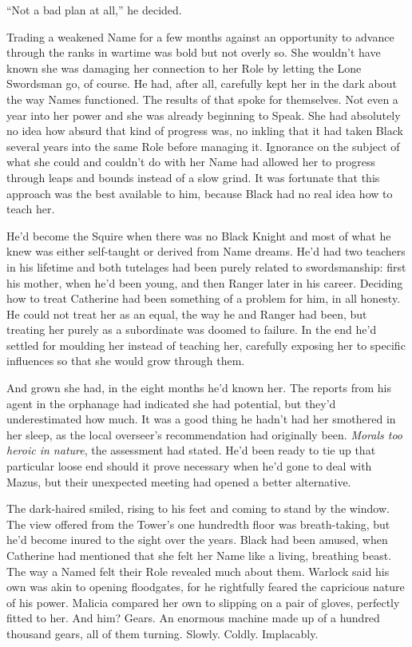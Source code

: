 \documentclass[12pt, openany]{book}
\begin{document}
“Not a bad plan at all,” he decided.

Trading a weakened Name for a few months against an opportunity to advance through the ranks in wartime was bold but not overly so. She wouldn’t have known she was damaging her connection to her Role by letting the Lone Swordsman go, of course. He had, after all, carefully kept her in the dark about the way Names functioned. The results of that spoke for themselves. Not even a year into her power and she was already beginning to Speak. She had absolutely no idea how absurd that kind of progress was, no inkling that it had taken Black several years into the same Role before managing it. Ignorance on the subject of what she could and couldn’t do with her Name had allowed her to progress through leaps and bounds instead of a slow grind. It was fortunate that this approach was the best available to him, because Black had no real idea how to teach her.

He’d become the Squire when there was no Black Knight and most of what he knew was either self-taught or derived from Name dreams. He’d had two teachers in his lifetime and both tutelages had been purely related to swordsmanship: first his mother, when he’d been young, and then Ranger later in his career. Deciding how to treat Catherine had been something of a problem for him, in all honesty. He could not treat her as an equal, the way he and Ranger had been, but treating her purely as a subordinate was doomed to failure. In the end he’d settled for moulding her instead of teaching her, carefully exposing her to specific influences so that she would grow through them.

And grown she had, in the eight months he’d known her. The reports from his agent in the orphanage had indicated she had potential, but they’d underestimated how much. It was a good thing he hadn’t had her smothered in her sleep, as the local overseer’s recommendation had originally been. \textit{Morals too heroic in nature}, the assessment had stated. He’d been ready to tie up that particular loose end should it prove necessary when he’d gone to deal with Mazus, but their unexpected meeting had opened a better alternative.

The dark-haired smiled, rising to his feet and coming to stand by the window. The view offered from the Tower’s one hundredth floor was breath-taking, but he’d become inured to the sight over the years. Black had been amused, when Catherine had mentioned that she felt her Name like a living, breathing beast. The way a Named felt their Role revealed much about them. Warlock said his own was akin to opening floodgates, for he rightfully feared the capricious nature of his power. Malicia compared her own to slipping on a pair of gloves, perfectly fitted to her. And him? Gears. An enormous machine made up of a hundred thousand gears, all of them turning. Slowly. Coldly. Implacably.
\end{document}
